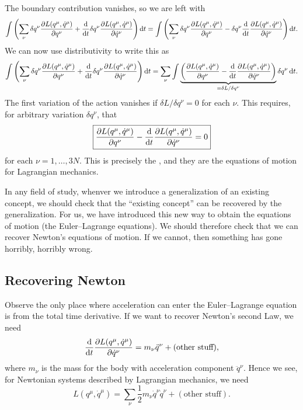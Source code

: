 The boundary contribution vanishes, so we are left with
\begin{equation}
\int \left(\sum_{\nu} \delta q^{\nu}\frac{\partial L(q^{\mu}, \dot{q}^{\mu})}{\partial q^{\nu}}
+\frac{\mathrm{d}}{\mathrm{d} t}\delta q^{\nu}\frac{\partial L(q^{\mu}, \dot{q}^{\mu})}{\partial \dot{q}^{\nu}}\right)\mathrm{d} t
=\int \left(\sum_{\nu} \delta q^{\nu}\frac{\partial L(q^{\mu}, \dot{q}^{\mu})}{\partial q^{\nu}}
-\delta q^{\nu}\frac{\mathrm{d}}{\mathrm{d} t}\frac{\partial L(q^{\mu}, \dot{q}^{\mu})}{\partial \dot{q}^{\nu}}\right)\mathrm{d} t.
\end{equation}
We can now use distributivity to write this as
\begin{equation}
\int \left(\sum_{\nu} \delta q^{\nu}\frac{\partial L(q^{\mu}, \dot{q}^{\mu})}{\partial q^{\nu}}
+\frac{\mathrm{d}}{\mathrm{d} t}\delta q^{\nu}\frac{\partial L(q^{\mu}, \dot{q}^{\mu})}{\partial \dot{q}^{\nu}}\right)\mathrm{d} t
=\sum_{\nu} \int \underbrace{\left(\frac{\partial L(q^{\mu}, \dot{q}^{\mu})}{\partial q^{\nu}}
-\frac{\mathrm{d}}{\mathrm{d} t}\frac{\partial L(q^{\mu}, \dot{q}^{\mu})}{\partial
  \dot{q}^{\nu}}\right)}_{=\delta L/\delta q^{\nu}}\delta q^{\nu}\,\mathrm{d} t.
\end{equation}
The first variation of the action vanishes if $\delta L/\delta q^{\nu}=0$ for each $\nu$.
This requires, for arbitrary variation $\delta q^{\nu}$, that
\begin{equation}
\boxed{\frac{\partial L(q^{\mu}, \dot{q}^{\mu})}{\partial q^{\nu}}
-\frac{\mathrm{d}}{\mathrm{d} t}\frac{\partial L(q^{\mu}, \dot{q}^{\mu})}{\partial \dot{q}^{\nu}}
= 0}
\end{equation}
for each $\nu=1,\dots,3N$. This is precisely the ,
and they are the equations of motion for Lagrangian mechanics.

In any field of study, whenver we introduce a generalization of an
existing concept, we should check that the ``existing concept'' can be
recovered by the generalization. For us, we have introduced this new way
to obtain the equations of motion (the Euler--Lagrange equations). We
should therefore check that we can recover Newton's equations of motion.
If we cannot, then something has gone horribly, horribly wrong.

\subsection{Recovering Newton}

\M
Observe the only place where acceleration can enter the Euler--Lagrange
equation is from the total time derivative. If we want to recover
Newton's second Law, we need
\begin{equation}
\frac{\mathrm{d}}{\mathrm{d} t}\frac{\partial L(q^{\mu}, \dot{q}^{\mu})}{\partial \dot{q}^{\nu}}
=m_{\nu}\ddot{q}^{\nu} + (\mbox{other stuff}),
\end{equation}
where $m_{\nu}$ is the mass for the body with acceleration component $\ddot{q}^{\nu}$.
Hence we see, for Newtonian systems described by Lagrangian mechanics,
we need
\begin{equation}
L(q^{\mu}, \dot{q}^{\mu}) =
\sum_{\nu}\frac{1}{2}m_{\nu}\dot{q}^{\nu}\dot{q}^{\nu} + (\mbox{other stuff}).
\end{equation}

